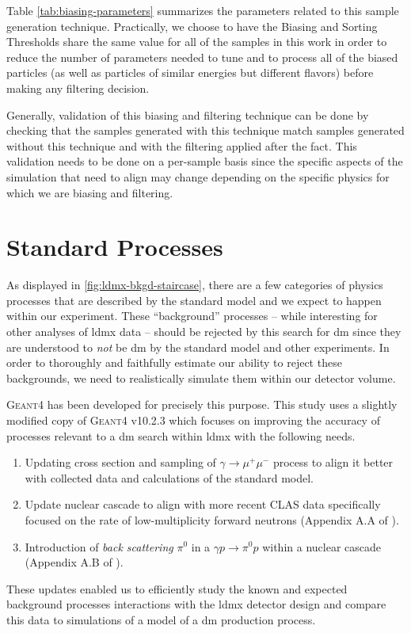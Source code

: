 Table \ref{tab:biasing-parameters} summarizes the parameters related to this
sample generation technique.
Practically, we choose to have the Biasing and Sorting Thresholds share the same value for all
of the samples in this work in order to reduce the number of parameters needed to tune and
to process all of the biased particles (as well as particles of similar energies
but different flavors) before making any filtering decision.

Generally, validation of this biasing and filtering technique can be done by checking that
the samples generated with this technique match samples generated without this technique
and with the filtering applied after the fact.
This validation needs to be done on a per-sample basis since the specific aspects of
the simulation that need to align may change depending on the specific physics
for which we are biasing and filtering.

\section{Standard Processes}
As displayed in \cref{fig:ldmx-bkgd-staircase}, there are a few categories of physics processes
that are described by the standard model and we expect to happen within our experiment. These
``background'' processes -- while interesting for other analyses of \ac{ldmx} data -- should be
rejected by this search for \ac{dm} since they are understood to \emph{not} be \ac{dm} by the
standard model and other experiments. In order to thoroughly and faithfully estimate our ability to
reject these backgrounds, we need to realistically simulate them within our detector volume.

\textsc{Geant4} \cite{geant4} has been developed for precisely this purpose. This study uses a slightly modified copy of \textsc{Geant4} v10.2.3 which focuses on improving the accuracy of processes relevant to a \ac{dm} search within \ac{ldmx} with the following needs.
\begin{enumerate}
  \item Updating cross section and sampling of $\gamma\to\mu^+\mu^-$ process to align it better with
        collected data and calculations of the standard model.
  \item Update nuclear cascade to align with more recent CLAS data specifically focused on the rate of
        low-multiplicity forward neutrons (Appendix A.A of \cite{ldmx-whitepaper}).
  \item Introduction of \emph{back scattering} $\pi^0$ in a $\gamma p \to \pi^0 p$ within a nuclear cascade
        (Appendix A.B of \cite{ldmx-whitepaper}).
\end{enumerate}
These updates enabled us to efficiently study the known and expected background processes interactions with the \ac{ldmx} detector design and compare this data to simulations of a model of a \ac{dm} production process.

